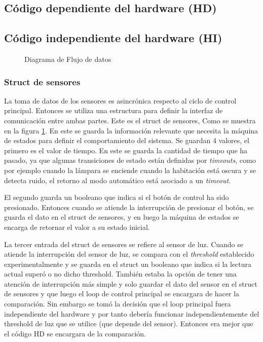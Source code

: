 \subsection{Código dependiente del hardware (HD)}



\subsection{Código independiente del hardware (HI)}

\begin{figure}
\centering
\scalebox{.5}{}
\caption{Diagrama de Flujo de datos}
\label{fig:data_flow}
\end{figure}


\subsubsection{Struct de sensores}
La toma de datos de los sensores es asincrónica respecto al ciclo de control principal. Entonces se
utiliza una estructura para definir la interfaz de comunicación entre ambas partes. Este es el
struct de sensores, Como se muestra en la figura \ref{fig:data_flow}. En este se guarda la
información relevante que necesita la máquina de estados para definir el comportamiento del
sistema. Se guardan 4 valores, el primero es el valor de tiempo. En este se guarda la cantidad de
tiempo que ha pasado, ya que algunas transiciones de estado están definidas por \textit{timeouts},
como por ejemplo cuando la lámpara se enciende cuando la habitación está oscura y se detecta ruido,
el retorno al modo automático está asociado a un \textit{timeout}.

El segundo guarda un booleano que indica si el botón de control ha sido presionado. Entonces cuando
se atiende la interrupción de presionar el botón, se guarda el dato en el struct de sensores, y
en luego la máquina de estados se encarga de retornar el valor a su estado inicial.

La tercer entrada del struct de sensores se refiere al sensor de luz. Cuando se atiende la
interrupción del sensor de luz, se compara con el \textit{threshold} establecido experimentalmente y
se guarda en el struct un booleano que indica si la lectura actual superó o no dicho
threshold. También estaba la opción de tener una atención de interrupción más simple y solo guardar
el dato del sensor en el struct de sensores y que luego el loop de control principal se encargara de
hacer la comparación. Sin embargo se tomó la decisión que el loop principal fuera independiente del
hardware y por tanto debería funcionar independientemente del threshold de luz que se utilice (que
depende del sensor). Entonces era mejor que el código HD se encargara de la comparación.

